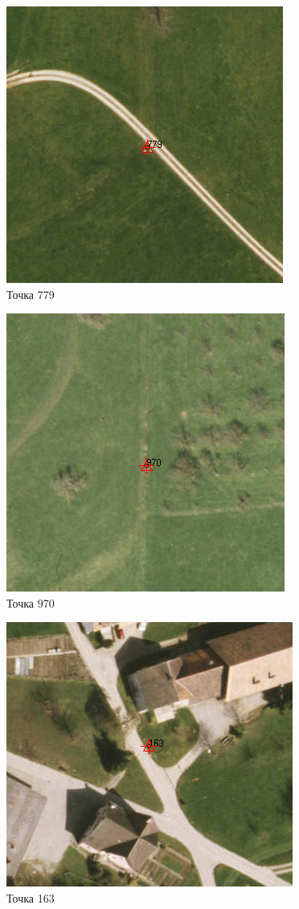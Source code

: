 \documentclass[
  12pt,
]{book}
\begin{document}
\begin{figure}
\centering
\includegraphics{images/Ref15/Point_779.png}
\caption{Точка 779}
\end{figure}

\begin{figure}
\centering
\includegraphics{images/Ref15/Point_970.png}
\caption{Точка 970}
\end{figure}

\begin{figure}
\centering
\includegraphics{images/Ref15/Point_163.png}
\caption{Точка 163}
\end{figure}
\end{document}
